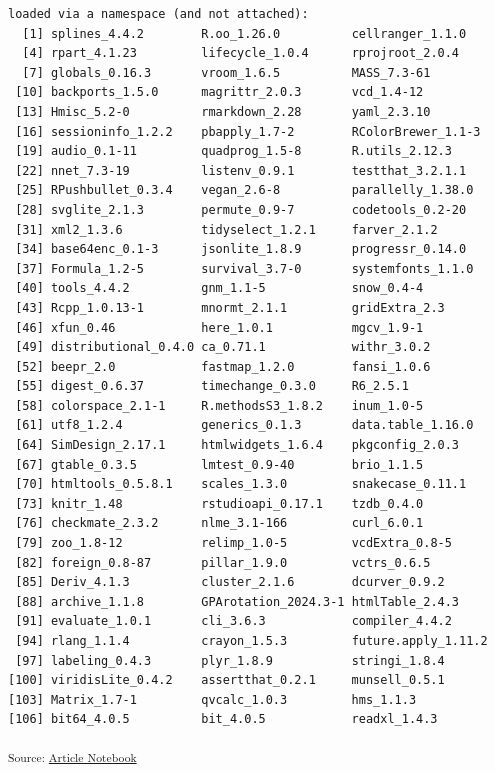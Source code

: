 \documentclass[
  letterpaper,
  DIV=11,
  numbers=noendperiod]{scrartcl}
\begin{document}
\begin{verbatim}
loaded via a namespace (and not attached):
  [1] splines_4.4.2        R.oo_1.26.0          cellranger_1.1.0    
  [4] rpart_4.1.23         lifecycle_1.0.4      rprojroot_2.0.4     
  [7] globals_0.16.3       vroom_1.6.5          MASS_7.3-61         
 [10] backports_1.5.0      magrittr_2.0.3       vcd_1.4-12          
 [13] Hmisc_5.2-0          rmarkdown_2.28       yaml_2.3.10         
 [16] sessioninfo_1.2.2    pbapply_1.7-2        RColorBrewer_1.1-3  
 [19] audio_0.1-11         quadprog_1.5-8       R.utils_2.12.3      
 [22] nnet_7.3-19          listenv_0.9.1        testthat_3.2.1.1    
 [25] RPushbullet_0.3.4    vegan_2.6-8          parallelly_1.38.0   
 [28] svglite_2.1.3        permute_0.9-7        codetools_0.2-20    
 [31] xml2_1.3.6           tidyselect_1.2.1     farver_2.1.2        
 [34] base64enc_0.1-3      jsonlite_1.8.9       progressr_0.14.0    
 [37] Formula_1.2-5        survival_3.7-0       systemfonts_1.1.0   
 [40] tools_4.4.2          gnm_1.1-5            snow_0.4-4          
 [43] Rcpp_1.0.13-1        mnormt_2.1.1         gridExtra_2.3       
 [46] xfun_0.46            here_1.0.1           mgcv_1.9-1          
 [49] distributional_0.4.0 ca_0.71.1            withr_3.0.2         
 [52] beepr_2.0            fastmap_1.2.0        fansi_1.0.6         
 [55] digest_0.6.37        timechange_0.3.0     R6_2.5.1            
 [58] colorspace_2.1-1     R.methodsS3_1.8.2    inum_1.0-5          
 [61] utf8_1.2.4           generics_0.1.3       data.table_1.16.0   
 [64] SimDesign_2.17.1     htmlwidgets_1.6.4    pkgconfig_2.0.3     
 [67] gtable_0.3.5         lmtest_0.9-40        brio_1.1.5          
 [70] htmltools_0.5.8.1    scales_1.3.0         snakecase_0.11.1    
 [73] knitr_1.48           rstudioapi_0.17.1    tzdb_0.4.0          
 [76] checkmate_2.3.2      nlme_3.1-166         curl_6.0.1          
 [79] zoo_1.8-12           relimp_1.0-5         vcdExtra_0.8-5      
 [82] foreign_0.8-87       pillar_1.9.0         vctrs_0.6.5         
 [85] Deriv_4.1.3          cluster_2.1.6        dcurver_0.9.2       
 [88] archive_1.1.8        GPArotation_2024.3-1 htmlTable_2.4.3     
 [91] evaluate_1.0.1       cli_3.6.3            compiler_4.4.2      
 [94] rlang_1.1.4          crayon_1.5.3         future.apply_1.11.2 
 [97] labeling_0.4.3       plyr_1.8.9           stringi_1.8.4       
[100] viridisLite_0.4.2    assertthat_0.2.1     munsell_0.5.1       
[103] Matrix_1.7-1         qvcalc_1.0.3         hms_1.1.3           
[106] bit64_4.0.5          bit_4.0.5            readxl_1.4.3        
\end{verbatim}

\textsubscript{Source:
\href{https://pgmj.github.io/rasch_itemfit/index.qmd.html}{Article
Notebook}}
\end{document}
